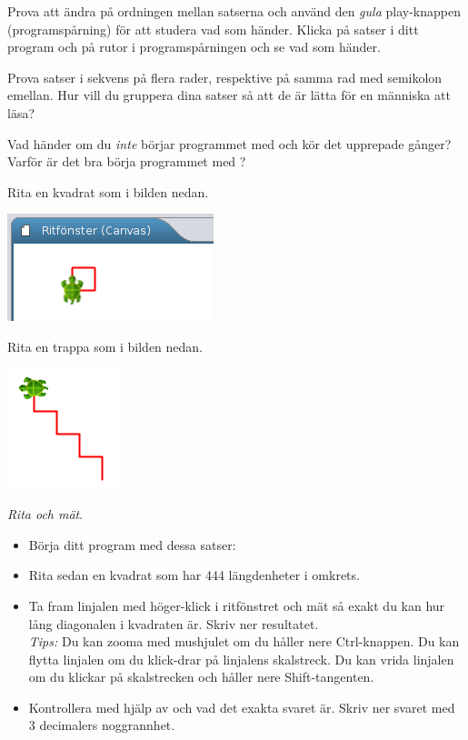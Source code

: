 \Subtask Prova att ändra på ordningen mellan satserna och använd den \emph{gula} play-knappen  (programspårning) för att studera vad som händer. Klicka på satser i ditt program och på rutor i programspårningen och se vad som händer.

\Subtask Prova satser i sekvens på flera rader, respektive på samma rad med semikolon emellan. Hur vill du gruppera dina satser så att de är lätta för en människa att läsa?

\Subtask\Pen Vad händer om du \emph{inte} börjar programmet med  och kör det upprepade gånger? Varför är det bra börja programmet med ? 

\Subtask Rita en kvadrat som i bilden nedan.

\includegraphics{../img/kojo/kvadrat}

\Subtask Rita en trappa som i bilden nedan.

\includegraphics[width=0.25\textwidth]{../img/kojo/stairs}

\Subtask \emph{Rita och mät}. 
\begin{itemize}[noitemsep]
\item Börja ditt program med dessa satser:\\  
\item Rita sedan en kvadrat som har 444 längdenheter i omkrets. 
\item Ta fram linjalen med höger-klick i ritfönstret och mät så exakt du kan hur lång diagonalen i kvadraten är. Skriv ner resultatet. \\ \emph{Tips:} Du kan zooma med mushjulet om du håller nere Ctrl-knappen. Du kan flytta linjalen om du klick-drar på linjalens skalstreck. Du kan vrida linjalen om du klickar på skalstrecken och håller nere Shift-tangenten. 
\item Kontrollera med hjälp av  och  vad det exakta svaret är. Skriv ner svaret med 3 decimalers noggrannhet. 
\end{itemize}

